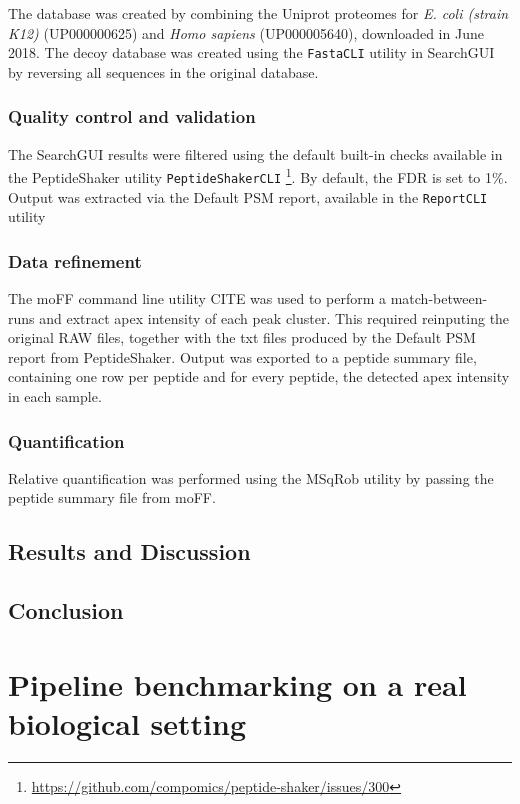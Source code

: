 \documentclass[11pt, a4paper]{report}
\begin{document}
The database was created by combining the Uniprot proteomes for \textit{E. coli (strain K12)} (UP000000625) and \textit{Homo sapiens} (UP000005640), downloaded in June 2018. The decoy database was created using the \texttt{FastaCLI} utility in SearchGUI by reversing all sequences in the original database.

\subsection{Quality control and validation}

The SearchGUI results were filtered using the default built-in checks available in the PeptideShaker utility \texttt{PeptideShakerCLI} \footnote{\href{https://github.com/compomics/peptide-shaker/issues/300}{https://github.com/compomics/peptide-shaker/issues/300}}. By default, the FDR is set to 1\%. Output was extracted via the Default PSM report, available in the \texttt{ReportCLI} utility


\subsection{Data refinement}

The moFF command line utility CITE was used to perform a match-between-runs and extract apex intensity of each peak cluster. This required reinputing the original RAW files, together with the txt files produced by the Default PSM report from PeptideShaker. Output was exported to a peptide summary file, containing  one row per peptide and for every peptide, the detected apex intensity in each sample.

\subsection{Quantification}

Relative quantification was performed using the MSqRob utility by passing the peptide summary file from moFF. 


\section{Results and Discussion}




\section{Conclusion}


\chapter{Pipeline benchmarking on a real biological setting}
\label{chap:benchmark}
\end{document}
